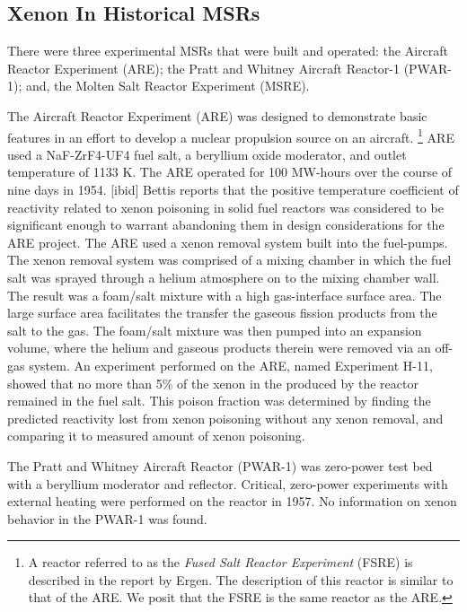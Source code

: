 \subsection{Xenon In Historical MSRs}
There were three experimental MSRs that were built and operated: the Aircraft Reactor Experiment (ARE); the Pratt and Whitney Aircraft Reactor-1 (PWAR-1); and, the Molten Salt Reactor Experiment (MSRE).

The Aircraft Reactor Experiment (ARE) was designed to demonstrate basic features in an effort to develop a nuclear propulsion source on an aircraft. \footnote{A reactor referred to as the \textit{Fused Salt Reactor Experiment} (FSRE) is described in the report by Ergen.\cite{Egen1957}  The description of this reactor is similar to that of the ARE.  We posit that the FSRE is the same reactor as the ARE.}  ARE used a NaF-ZrF4-UF4 fuel salt, a beryllium oxide moderator, and outlet temperature of 1133 K.\cite[p. 62]{OSullivan2015} The ARE operated for 100 MW-hours over the course of nine days in 1954. [ibid] Bettis reports that the positive temperature coefficient of reactivity related to xenon poisoning in solid fuel reactors was considered to be significant enough to warrant abandoning them in design considerations for the ARE project.\cite{Bettis1957} The ARE used a xenon removal system built into the fuel-pumps. The xenon removal system was comprised of a mixing chamber in which the fuel salt was sprayed through a helium atmosphere on to the mixing chamber wall.  The result was a foam/salt mixture with a high gas-interface surface area.  The large surface area facilitates the transfer the gaseous fission products from the salt to the gas. The foam/salt mixture was then pumped into an expansion volume, where the helium and gaseous products therein were removed via an off-gas system.\cite[pp. 31-32]{Fraas1956} An experiment performed on the ARE, named Experiment H-11,   showed that no more than 5\% of the xenon in the produced by the reactor remained in the fuel salt.\cite[p. 67]{ORNL1845}  This poison fraction was determined by finding the predicted reactivity lost from xenon poisoning without any xenon removal, and comparing it to measured amount of xenon poisoning. 

The Pratt and Whitney Aircraft Reactor (PWAR-1) was zero-power test bed with a beryllium moderator and reflector. \cite[p. 286]{Dolan2017} Critical, zero-power experiments with external heating were performed on the reactor in 1957.  \cite[p. 2]{ORNL2536} No information on xenon behavior in the PWAR-1 was found. 

